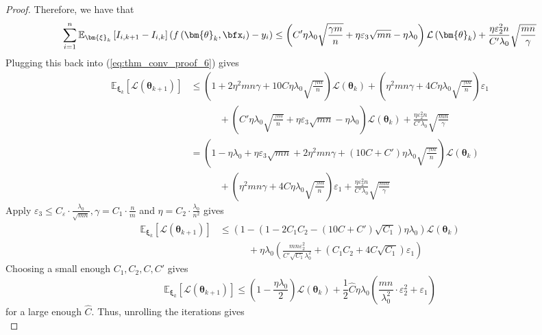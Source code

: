 \documentclass[10pt]{article} %
\theoremstyle{definition}
\theoremstyle{plain}
\newcommand{\paren}[1]{\left(#1\right)}
\providecommand{\E}{\mathbb{E}}
\def\calL{{\mathcal{L}}}
\begin{document}
\begin{proof}
    Therefore, we have that
    \[
        \sum_{i=1}^n\E_{\bm{\xi}_k}\left[I_{i,k+1} - I_{i,k}\right]\paren{f\paren{\bm{\theta}_k,\bfx_i}-y_i} \leq \paren{C'\eta\lambda_0\sqrt{\frac{\gamma m}{n}} + \eta\varepsilon_3\sqrt{mn} - \eta\lambda_0}\calL\paren{\bm{\theta}_k} + \frac{\eta\varepsilon_2^2 n}{C'\lambda_0}\sqrt{\frac{mn}{\gamma}}
    \]
    Plugging this back into (\ref{eq:thm_conv_proof_6}) gives
    \begin{align*}
        \E_{\bm{\xi}_k}\left[\calL\paren{\bm{\theta}_{k+1}}\right] & \leq \paren{1 + 2\eta^2mn\gamma + 10C\eta\lambda_0\sqrt{\frac{\gamma m}{n}}}\calL\paren{\bm{\theta}_k} + \paren{\eta^2mn\gamma + 4C\eta\lambda_0\sqrt{\frac{\gamma m}{n}}}\varepsilon_1\\
        &\quad\quad\quad  + \paren{C'\eta\lambda_0\sqrt{\frac{\gamma m}{n}} + \eta\varepsilon_3\sqrt{mn} - \eta\lambda_0}\calL\paren{\bm{\theta}_k}+ \frac{\eta\varepsilon_2^2 n}{C'\lambda_0}\sqrt{\frac{mn}{\gamma}}\\
        & = \paren{1 - \eta\lambda_0 + \eta\varepsilon_3\sqrt{mn}+ 2\eta^2mn\gamma + \paren{10C + C'}\eta\lambda_0\sqrt{\frac{\gamma m}{n}}}\calL\paren{\bm{\theta}_k}\\
        &\quad\quad\quad + \paren{\eta^2mn\gamma + 4C\eta\lambda_0\sqrt{\frac{\gamma m}{n}}}\varepsilon_1+\frac{\eta\varepsilon_2^2 n}{C'\lambda_0}\sqrt{\frac{mn}{\gamma}}
    \end{align*}
    Apply $\varepsilon_3\leq C_{\varepsilon}\cdot\frac{\lambda_0}{\sqrt{mn}}, \gamma = C_1\cdot\frac{n}{m}$ and $\eta = C_2\cdot \frac{\lambda_0}{n^2}$ gives
    \begin{align*}
            \E_{\bm{\xi}_k}\left[\calL\paren{\bm{\theta}_{k+1}}\right] & \leq \paren{1 - \paren{1 - 2C_1C_2 - \paren{10C + C'}\sqrt{C_1}}\eta\lambda_0}\calL\paren{\bm{\theta}_k}\\
            & \quad\quad\quad + \eta\lambda_0\paren{\frac{mn\varepsilon_2^2}{C'\sqrt{C_1}\lambda_0^2} + \paren{C_1C_2 + 4C\sqrt{C_1}}\varepsilon_1}
    \end{align*}
    Choosing a small enough $C_1, C_2, C, C'$ gives
    \begin{equation}
        \E_{\bm{\xi}_k}\left[\calL\paren{\bm{\theta}_{k+1}}\right] \leq \paren{1 - \frac{\eta\lambda_0}{2}}\calL\paren{\bm{\theta}_k} + \frac{1}{2}\hat{C}\eta\lambda_0\paren{\frac{mn}{\lambda_0^2}\cdot\varepsilon_2^2 + \varepsilon_1}   
    \end{equation}
    for a large enough $\hat{C}$. Thus, unrolling the iterations gives
    \begin{equation}

\end{equation}
\end{proof}
\end{document}
